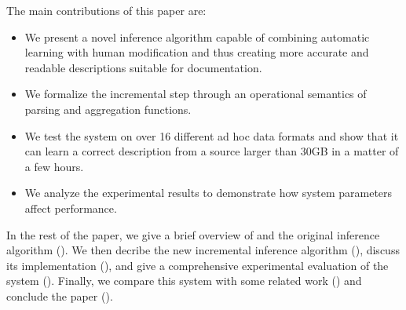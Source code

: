 The main contributions of this paper are:
\begin{itemize}
\item We present a novel inference algorithm capable of
combining automatic learning with human modification and thus creating 
more accurate and readable descriptions suitable for documentation.
\item We formalize the incremental step through an operational semantics of 
parsing and aggregation functions.
\item We test the system on over 16 different ad hoc data formats and
show that it can learn a correct description from a source larger than
30GB in a matter of a few hours.
\item We analyze the experimental results to demonstrate how system parameters affect 
performance.
\end{itemize}

In the rest of the paper, we give a brief overview of \pads{} and the original
\learnpads{} inference algorithm (). We then decribe
the new incremental inference algorithm (), discuss its
implementation (), and give a comprehensive experimental
evaluation of the system (). Finally, we compare this
system with some related work () and conclude
the paper ().
